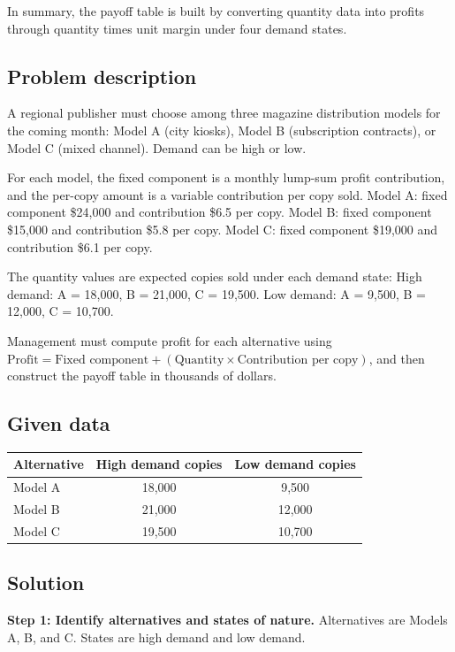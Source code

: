 \begin{ExamProblems}
		In summary, the payoff table is built by converting quantity data into profits through quantity times unit margin under four demand states.
		
		\item
		\subsection*{Problem description}
		A regional publisher must choose among three magazine distribution models for the coming month: Model A (city kiosks),
		Model B (subscription contracts), or Model C (mixed channel). Demand can be high or low.
		
		For each model, the fixed component is a monthly lump-sum profit contribution, and the per-copy amount is a variable contribution per copy sold.
		Model A: fixed component \$24{,}000 and contribution \$6.5 per copy.
		Model B: fixed component \$15{,}000 and contribution \$5.8 per copy.
		Model C: fixed component \$19{,}000 and contribution \$6.1 per copy.
		
		The quantity values are expected copies sold under each demand state:
		High demand: A = 18{,}000, B = 21{,}000, C = 19{,}500.
		Low demand: A = 9{,}500, B = 12{,}000, C = 10{,}700.
		
		Management must compute profit for each alternative using
		\(\text{Profit}=\text{Fixed component}+(\text{Quantity}\times\text{Contribution per copy})\), and then construct the payoff table in thousands of dollars.
		\subsection*{Given data}
		\begin{center}
			\begin{tabular}{l c c}
				\toprule
				Alternative & High demand copies & Low demand copies \\
				\midrule
				Model A & 18{,}000 & 9{,}500 \\
				Model B & 21{,}000 & 12{,}000 \\
				Model C & 19{,}500 & 10{,}700 \\
				\bottomrule
			\end{tabular}
		\end{center}
		
		\subsection*{Solution}
		\textbf{Step 1: Identify alternatives and states of nature.} Alternatives are Models A, B, and C. States are high demand and low demand.
		

\end{ExamProblems}
